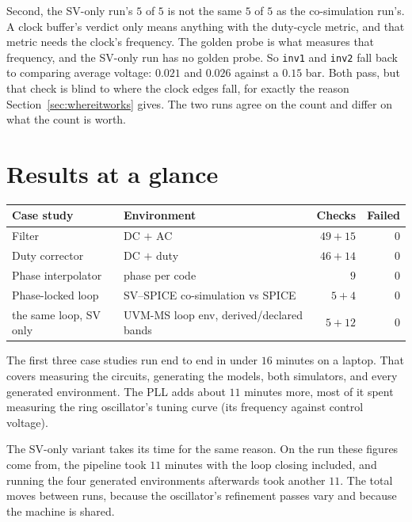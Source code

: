 \documentclass[11pt,a4paper]{article}
\begin{document}
Second, the SV-only run's $5$ of $5$ is not the same $5$ of $5$ as the
co-simulation run's. A clock buffer's verdict only means anything with
the duty-cycle metric, and that metric needs the clock's frequency.
The golden probe is what measures that frequency, and the SV-only run
has no golden probe. So \texttt{inv1} and \texttt{inv2} fall back to
comparing average voltage: $0.021$ and $0.026$ against a $0.15$ bar.
Both pass, but that check is blind to where the clock edges fall, for
exactly the reason Section~\ref{sec:whereitworks} gives. The two runs
agree on the count and differ on what the count is worth.

\section{Results at a glance}

\begin{center}
\begin{tabular}{@{}llrr@{}}
\toprule
\textbf{Case study} & \textbf{Environment} & \textbf{Checks} & \textbf{Failed} \\
\midrule
Filter        & DC $+$ AC                  & $49 + 15$ & $0$ \\
Duty corrector & DC $+$ duty               & $46 + 14$ & $0$ \\
Phase interpolator & phase per code        & $9$       & $0$ \\
Phase-locked loop & SV--SPICE co-simulation vs SPICE & $5 + 4$   & $0$ \\
\quad the same loop, SV only & UVM-MS loop env, derived/declared bands & $5 + 12$ & $0$ \\
\bottomrule
\end{tabular}
\end{center}

\noindent The first three case studies run end to end in under $16$
minutes on a laptop. That covers measuring the circuits, generating
the models, both simulators, and every generated environment. The PLL
adds about $11$ minutes more, most of it spent measuring the ring
oscillator's tuning curve (its frequency against control voltage).

The SV-only variant takes its time for the same reason. On the run
these figures come from, the pipeline took $11$ minutes with the loop
closing included, and running the four generated environments
afterwards took another $11$. The total moves between runs, because
the oscillator's refinement passes vary and because the machine is
shared.
\end{document}
